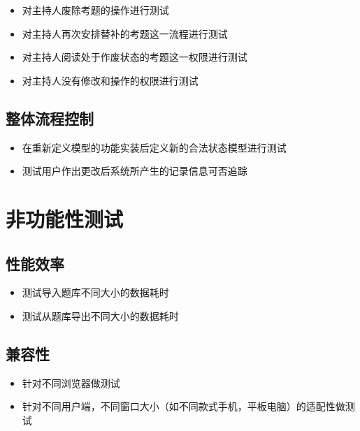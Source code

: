 \documentclass[hyperref, a4paper]{ctexart}
\providecommand{\tightlist}{%
  \setlength{\itemsep}{0pt}\setlength{\parskip}{0pt}}
\begin{document}
\begin{itemize}
\tightlist
\item
  对主持人废除考题的操作进行测试
\item
  对主持人再次安排替补的考题这一流程进行测试
\item
  对主持人阅读处于作废状态的考题这一权限进行测试
\item
  对主持人没有修改和操作的权限进行测试
\end{itemize}

\hypertarget{ux6574ux4f53ux6d41ux7a0bux63a7ux5236}{%
\subsection{整体流程控制}\label{ux6574ux4f53ux6d41ux7a0bux63a7ux5236}}

\begin{itemize}
\item
  在重新定义模型的功能实装后定义新的合法状态模型进行测试
\item
  测试用户作出更改后系统所产生的记录信息可否追踪
\end{itemize}

\hypertarget{ux975eux529fux80fdux6027ux6d4bux8bd5}{%
\section{非功能性测试}\label{ux975eux529fux80fdux6027ux6d4bux8bd5}}

\hypertarget{ux6027ux80fdux6548ux7387}{%
\subsection{性能效率}\label{ux6027ux80fdux6548ux7387}}

\begin{itemize}
\tightlist
\item
  测试导入题库不同大小的数据耗时
\item
  测试从题库导出不同大小的数据耗时
\end{itemize}

\hypertarget{ux517cux5bb9ux6027}{%
\subsection{兼容性}\label{ux517cux5bb9ux6027}}

\begin{itemize}
\tightlist
\item
  针对不同浏览器做测试
\item
  针对不同用户端，不同窗口大小（如不同款式手机，平板电脑）的适配性做测试
\end{itemize}
\end{document}
